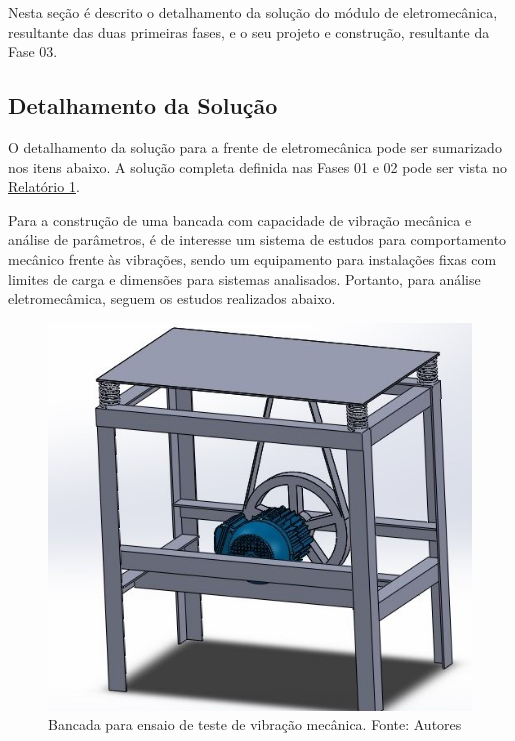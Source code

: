  \label{desenvolvimento_eletromecanica}
Nesta seção é descrito o detalhamento da solução do módulo de eletromecânica, resultante das duas primeiras fases,
e o seu projeto e construção, resultante da Fase 03.

\subsection{Detalhamento da Solução}

O detalhamento da solução para a frente de eletromecânica pode ser sumarizado nos itens abaixo. A solução completa definida nas
  Fases 01 e 02 pode ser vista no \href{https://drive.google.com/file/d/0B5InkGKx6O-MR1B3eVYzZFpjQ3c/view?usp=sharing}{Relatório 1}.

Para a construção de uma bancada com capacidade de vibração mecânica e análise de parâmetros, é de interesse um sistema de estudos para comportamento mecânico frente às vibrações, sendo um equipamento para instalações fixas com limites de carga e dimensões para sistemas analisados. Portanto, para análise eletromecâmica, seguem os estudos realizados abaixo.

\begin{figure}[h!]
	\centering
		\includegraphics[keepaspectratio=true,scale=0.6]{figuras/1.png}
	\caption{Bancada para ensaio de teste de vibração mecânica. Fonte: Autores}
    \label{bancada}
\end{figure}

